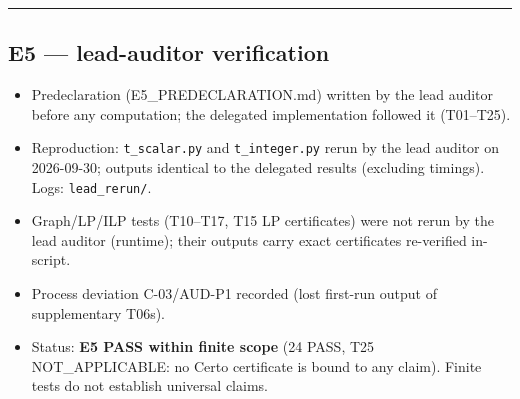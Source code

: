 \documentclass[
]{article}
\providecommand{\tightlist}{%
  \setlength{\itemsep}{0pt}\setlength{\parskip}{0pt}}
\begin{document}
\begin{center}\rule{0.5\linewidth}{0.5pt}\end{center}

\subsection{E5 --- lead-auditor
verification}\label{e5--lead-auditor-verification}

\begin{itemize}
\tightlist
\item
  Predeclaration (E5\_PREDECLARATION.md) written by the lead auditor
  before any computation; the delegated implementation followed it
  (T01--T25).
\item
  Reproduction: \texttt{t\_scalar.py} and \texttt{t\_integer.py} rerun
  by the lead auditor on 2026-09-30; outputs identical to the delegated
  results (excluding timings). Logs: \texttt{lead\_rerun/}.
\item
  Graph/LP/ILP tests (T10--T17, T15 LP certificates) were not rerun by
  the lead auditor (runtime); their outputs carry exact certificates
  re-verified in-script.
\item
  Process deviation C-03/AUD-P1 recorded (lost first-run output of
  supplementary T06s).
\item
  Status: \textbf{E5 PASS within finite scope} (24 PASS, T25
  NOT\_APPLICABLE: no Certo certificate is bound to any claim). Finite
  tests do not establish universal claims.
\end{itemize}
\end{document}

